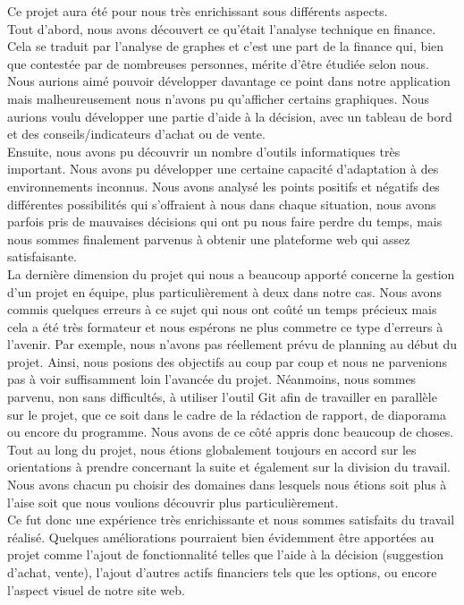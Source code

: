 Ce projet aura été pour nous très enrichissant sous différents aspects.\\

Tout d'abord, nous avons découvert ce qu'était l'analyse technique en finance. Cela se traduit par l'analyse de graphes et c'est une part de la finance qui, bien que contestée par de nombreuses personnes, mérite d'être étudiée selon nous. Nous aurions aimé pouvoir développer davantage ce point dans notre application mais malheureusement nous n'avons pu qu'afficher certains graphiques. Nous aurions voulu développer une partie d'aide à la décision, avec un tableau de bord et des conseils/indicateurs d'achat ou de vente.\\

Ensuite, nous avons pu découvrir un nombre d'outils informatiques très important. Nous avons pu développer une certaine capacité d'adaptation à des environnements inconnus. Nous avons analysé les points positifs et négatifs des différentes possibilités qui s'offraient à nous dans chaque situation, nous avons parfois pris de mauvaises décisions qui ont pu nous faire perdre du temps, mais nous sommes finalement parvenus à obtenir une plateforme web qui assez satisfaisante.\\

La dernière dimension du projet qui nous a beaucoup apporté concerne la gestion d'un projet en équipe, plus particulièrement à deux dans notre cas. Nous avons commis quelques erreurs à ce sujet qui nous ont coûté un temps précieux mais cela a été très formateur et nous espérons ne plus commetre ce type d'erreurs à l'avenir. Par exemple, nous n'avons pas réellement prévu de planning au début du projet. Ainsi, nous posions des objectifs au coup par coup et nous ne parvenions pas à voir suffisamment loin l'avancée du projet. Néanmoins, nous sommes parvenu, non sans difficultés, à utiliser l'outil Git afin de travailler en parallèle sur le projet, que ce soit dans le cadre de la rédaction de rapport, de diaporama ou encore du programme. Nous avons de ce côté appris donc beaucoup de choses.\\

Tout au long du projet, nous étions globalement toujours en accord sur les orientations à prendre concernant la suite et également sur la division du travail. Nous avons chacun pu choisir des domaines dans lesquels nous étions soit plus à l'aise soit que nous voulions découvrir plus particulièrement.\\

Ce fut donc une expérience très enrichissante et nous sommes satisfaits du travail réalisé. Quelques améliorations pourraient bien évidemment être apportées au projet comme l'ajout de fonctionnalité telles que l'aide à la décision (suggestion d'achat, vente), l'ajout d'autres actifs financiers tels que les options, ou encore l'aspect visuel de notre site web.
